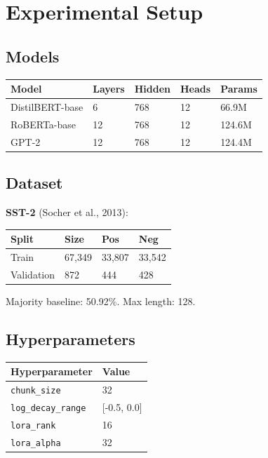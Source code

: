 \section{Experimental Setup}

\subsection{Models}

\begin{table}[H]
\centering
\small
\begin{tabular}{lllll}
\toprule
\textbf{Model} & \textbf{Layers} & \textbf{Hidden} & \textbf{Heads} & \textbf{Params} \\
\midrule
DistilBERT-base & 6 & 768 & 12 & 66.9M \\
RoBERTa-base & 12 & 768 & 12 & 124.6M \\
GPT-2 & 12 & 768 & 12 & 124.4M \\
\bottomrule
\end{tabular}
\end{table}

\subsection{Dataset}

\textbf{SST-2} (Socher et al., 2013):

\begin{table}[H]
\centering
\small
\begin{tabular}{llll}
\toprule
\textbf{Split} & \textbf{Size} & \textbf{Pos} & \textbf{Neg} \\
\midrule
Train & 67,349 & 33,807 & 33,542 \\
Validation & 872 & 444 & 428 \\
\bottomrule
\end{tabular}
\end{table}

Majority baseline: 50.92\%. Max length: 128.

\subsection{Hyperparameters}

\begin{table}[H]
\centering
\small
\begin{tabular}{ll}
\toprule
\textbf{Hyperparameter} & \textbf{Value} \\
\midrule
\texttt{chunk\_size} & 32 \\
\texttt{log\_decay\_range} &  [-0.5, 0.0] \\
\texttt{lora\_rank} & 16 \\
\texttt{lora\_alpha} & 32 \\
\bottomrule
\end{tabular}
\end{table}

